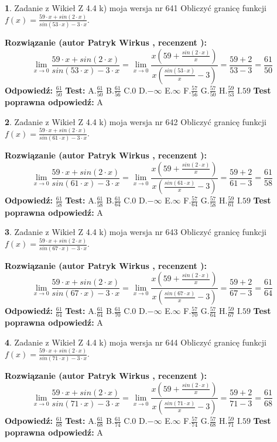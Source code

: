 \documentclass[12pt, a4paper]{article}
\theoremstyle{definition} %
\newtheorem{zad}{}
\newcommand{\zadStart}[1]{\begin{zad}#1\newline}
\newcommand{\zadStop}{\end{zad}}
\newcommand{\rozwStart}[2]{\noindent \textbf{Rozwiązanie (autor #1 , recenzent #2): }\newline}
\newcommand{\rozwStop}{\newline}
\newcommand{\odpStart}{\noindent \textbf{Odpowiedź:}\newline}
\newcommand{\odpStop}{\newline}
\newcommand{\testStart}{\noindent \textbf{Test:}\newline}
\newcommand{\testStop}{\newline}
\newcommand{\kluczStart}{\noindent \textbf{Test poprawna odpowiedź:}\newline}
\newcommand{\kluczStop}{\newline}
\begin{document}
\zadStart{Zadanie z Wikieł Z 4.4 k) moja wersja nr 641}
Obliczyć granicę funkcji $f(x)=\frac{59\cdot x +sin(2\cdot x)}{sin(53\cdot x) -3\cdot x}$.
\zadStop
\rozwStart{Patryk Wirkus}{}
$$\lim\limits_{x\to 0}\frac{59\cdot x +sin(2\cdot x)}{sin(53\cdot x) -3\cdot x}
=\lim\limits_{x\to 0}\frac{x(59+\frac{sin(2\cdot x)}{x})}{x(\frac{sin(53\cdot x)}{x}-3)}
=\frac{59+2}{53-3} = \frac{61}{50}$$
\rozwStop
\odpStart
$\frac{61}{50}$
\odpStop
\testStart
A.$\frac{61}{50}$
B.$\frac{61}{56}$
C.$0$
D.$-\infty$
E.$\infty$
F.$\frac{57}{56}$
G.$\frac{57}{50}$
H.$\frac{59}{53}$
I.$59$
\testStop
\kluczStart
A
\kluczStop



\zadStart{Zadanie z Wikieł Z 4.4 k) moja wersja nr 642}
Obliczyć granicę funkcji $f(x)=\frac{59\cdot x +sin(2\cdot x)}{sin(61\cdot x) -3\cdot x}$.
\zadStop
\rozwStart{Patryk Wirkus}{}
$$\lim\limits_{x\to 0}\frac{59\cdot x +sin(2\cdot x)}{sin(61\cdot x) -3\cdot x}
=\lim\limits_{x\to 0}\frac{x(59+\frac{sin(2\cdot x)}{x})}{x(\frac{sin(61\cdot x)}{x}-3)}
=\frac{59+2}{61-3} = \frac{61}{58}$$
\rozwStop
\odpStart
$\frac{61}{58}$
\odpStop
\testStart
A.$\frac{61}{58}$
B.$\frac{61}{64}$
C.$0$
D.$-\infty$
E.$\infty$
F.$\frac{57}{64}$
G.$\frac{57}{58}$
H.$\frac{59}{61}$
I.$59$
\testStop
\kluczStart
A
\kluczStop



\zadStart{Zadanie z Wikieł Z 4.4 k) moja wersja nr 643}
Obliczyć granicę funkcji $f(x)=\frac{59\cdot x +sin(2\cdot x)}{sin(67\cdot x) -3\cdot x}$.
\zadStop
\rozwStart{Patryk Wirkus}{}
$$\lim\limits_{x\to 0}\frac{59\cdot x +sin(2\cdot x)}{sin(67\cdot x) -3\cdot x}
=\lim\limits_{x\to 0}\frac{x(59+\frac{sin(2\cdot x)}{x})}{x(\frac{sin(67\cdot x)}{x}-3)}
=\frac{59+2}{67-3} = \frac{61}{64}$$
\rozwStop
\odpStart
$\frac{61}{64}$
\odpStop
\testStart
A.$\frac{61}{64}$
B.$\frac{61}{70}$
C.$0$
D.$-\infty$
E.$\infty$
F.$\frac{57}{70}$
G.$\frac{57}{64}$
H.$\frac{59}{67}$
I.$59$
\testStop
\kluczStart
A
\kluczStop



\zadStart{Zadanie z Wikieł Z 4.4 k) moja wersja nr 644}
Obliczyć granicę funkcji $f(x)=\frac{59\cdot x +sin(2\cdot x)}{sin(71\cdot x) -3\cdot x}$.
\zadStop
\rozwStart{Patryk Wirkus}{}
$$\lim\limits_{x\to 0}\frac{59\cdot x +sin(2\cdot x)}{sin(71\cdot x) -3\cdot x}
=\lim\limits_{x\to 0}\frac{x(59+\frac{sin(2\cdot x)}{x})}{x(\frac{sin(71\cdot x)}{x}-3)}
=\frac{59+2}{71-3} = \frac{61}{68}$$
\rozwStop
\odpStart
$\frac{61}{68}$
\odpStop
\testStart
A.$\frac{61}{68}$
B.$\frac{61}{74}$
C.$0$
D.$-\infty$
E.$\infty$
F.$\frac{57}{74}$
G.$\frac{57}{68}$
H.$\frac{59}{71}$
I.$59$
\testStop
\kluczStart
A
\kluczStop
\end{document}
